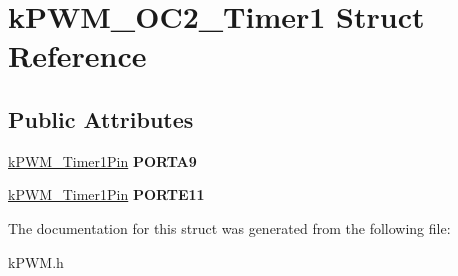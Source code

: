 \hypertarget{structkPWM__OC2__Timer1}{}\section{k\+P\+W\+M\+\_\+\+O\+C2\+\_\+\+Timer1 Struct Reference}
\label{structkPWM__OC2__Timer1}
\subsection*{Public Attributes}
\begin{DoxyCompactItemize}
\item 
\hyperlink{structkPWM__Timer1Pin}{k\+P\+W\+M\+\_\+\+Timer1\+Pin} {\bfseries P\+O\+R\+T\+A9}\hypertarget{structkPWM__OC2__Timer1_acaaf02851260e197bc1601e7c6f1e176}{}\label{structkPWM__OC2__Timer1_acaaf02851260e197bc1601e7c6f1e176}

\item 
\hyperlink{structkPWM__Timer1Pin}{k\+P\+W\+M\+\_\+\+Timer1\+Pin} {\bfseries P\+O\+R\+T\+E11}\hypertarget{structkPWM__OC2__Timer1_aab064b59538ccb13d231f1bb9d3c9b65}{}\label{structkPWM__OC2__Timer1_aab064b59538ccb13d231f1bb9d3c9b65}

\end{DoxyCompactItemize}


The documentation for this struct was generated from the following file\+:\begin{DoxyCompactItemize}
\item 
k\+P\+W\+M.\+h\end{DoxyCompactItemize}
